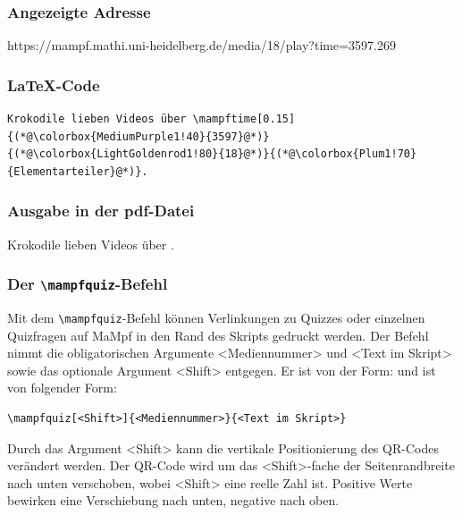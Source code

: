 \documentclass[parskip=off,index=totocnumbered]{scrartcl}
\begin{document}
\subsubsection*{Angezeigte Adresse}
https://mampf.mathi.uni-heidelberg.de/media/\colorbox{LightGoldenrod1!80}{18}/play?time=\colorbox{MediumPurple1!40}{3597.269}

\subsubsection*{\LaTeX-Code}
\vspace{-0.2cm}
   \begin{lstlisting}   
Krokodile lieben Videos über \mampftime[0.15]{(*@\colorbox{MediumPurple1!40}{3597}@*)}{(*@\colorbox{LightGoldenrod1!80}{18}@*)}{(*@\colorbox{Plum1!70}{Elementarteiler}@*)}. 
   \end{lstlisting}
\vspace{0.2cm}

\subsubsection*{Ausgabe in der pdf-Datei}
Krokodile lieben Videos über . 
\vspace{0.4cm}


\subsubsection{Der \texttt{\textbackslash mampfquiz}-Befehl} \label{subsubsec:quiz}
Mit dem \verb|\mampfquiz|-Befehl können Verlinkungen zu Quizzes oder einzelnen Quizfragen auf MaMpf in den Rand des Skripts gedruckt werden. Der Befehl nimmt die obligatorischen Argumente <Mediennummer> und <Text im Skript> sowie das optionale Argument <Shift> entgegen. Er ist von der Form: und ist von folgender Form:
   \begin{verbatim}
\mampfquiz[<Shift>]{<Mediennummer>}{<Text im Skript>}
   \end{verbatim}
\vspace{-0.5cm}
Durch das Argument <Shift> kann die vertikale Positionierung des QR-Codes verändert werden. Der QR-Code wird um das <Shift>-fache der Seitenrandbreite nach unten verschoben, wobei <Shift> eine reelle Zahl ist. Positive Werte bewirken eine Verschiebung nach unten, negative nach oben.  
\end{document}
